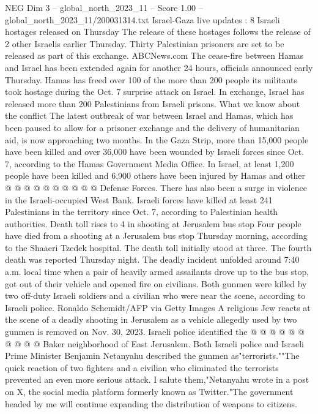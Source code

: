 \begin{textsample}{NEG Dim 3 – global\_north\_2023\_11 – Score 1.00 – global\_north\_2023\_11/200031314.txt}  \label{ex:f3_neg_276}
Israel-Gaza live updates : 8 Israeli hostages released on Thursday The release of these hostages follows the release of 2 other Israelis earlier Thursday.
Thirty Palestinian prisoners are set to be released as part of this exchange.
ABCNews.com The cease-fire between Hamas and Israel has been extended again for another 24 hours, officials announced early Thursday.
Hamas has freed over 100 of the more than 200 people its militants took hostage during the Oct. 7 surprise attack on Israel.
In exchange, Israel has released more than 200 Palestinians from Israeli prisons.
What we know about the conflict The latest outbreak of war between Israel and Hamas, which has been paused to allow for a prisoner exchange and the delivery of humanitarian aid, is now approaching two months.
In the Gaza Strip, more than 15,000 people have been killed and over 36,000 have been wounded by Israeli forces since Oct. 7, according to the Hamas Government Media Office.
In Israel, at least 1,200 people have been killed and 6,900 others have been injured by Hamas and other @ @ @ @ @ @ @ @ @ @ Defense Forces.
There has also been a surge in violence in the Israeli-occupied West Bank.
Israeli forces have killed at least 241 Palestinians in the territory since Oct. 7, according to Palestinian health authorities.
Death toll rises to 4 in shooting at Jerusalem bus stop Four people have died from a shooting at a Jerusalem bus stop Thursday morning, according to the Shaaeri Tzedek hospital.
The death toll initially stood at three.
The fourth death was reported Thursday night.
The deadly incident unfolded around 7:40 a.m. local time when a pair of heavily armed assailants drove up to the bus stop, got out of their vehicle and opened fire on civilians.
Both gunmen were killed by two off-duty Israeli soldiers and a civilian who were near the scene, according to Israeli police.
Ronaldo Schemidt/AFP via Getty Images A religious Jew reacts at the scene of a deadly shooting in Jerusalem as a vehicle allegedly used by two gunmen is removed on Nov. 30, 2023.
Israeli police identified the @ @ @ @ @ @ @ @ @ @ Baker neighborhood of East Jerusalem.
Both Israeli police and Israeli Prime Minister Benjamin Netanyahu described the gunmen as"terrorists.""The quick reaction of two fighters and a civilian who eliminated the terrorists prevented an even more serious attack.
I salute them,"Netanyahu wrote in a post on X, the social media platform formerly known as Twitter."The government headed by me will continue expanding the distribution of weapons to citizens.

\end{textsample}

